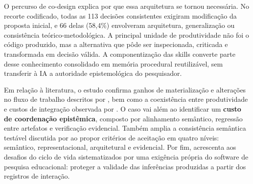\documentclass[preprint,12pt,authoryear]{elsarticle}
\begin{document}
O percurso de co-design explica por que essa arquitetura se tornou necessária. No recorte codificado, todas as 113 decisões consistentes exigiram modificação da proposta inicial, e 66 delas (58,4\%) envolveram arquitetura, generalização ou consistência teórico-metodológica. A principal unidade de produtividade não foi o código produzido, mas a alternativa que pôde ser inspecionada, criticada e transformada em decisão válida. A componentização das skills converte parte desse conhecimento consolidado em memória procedural reutilizável, sem transferir à IA a autoridade epistemológica do pesquisador.

Em relação à literatura, o estudo confirma ganhos de materialização e alterações no fluxo de trabalho descritos por \citet{ulfsnes2024transforming}, bem como a coexistência entre produtividade e custos de integração observada por \citet{song2024impact}. O caso vai além ao identificar um \textbf{custo de coordenação epistêmica}, composto por alinhamento semântico, regressão entre artefatos e verificação evidencial. Também amplia a consistência semântica testável discutida por \citet{zhang2024agilegen} ao propor critérios de aceitação em quatro níveis: semântico, representacional, arquitetural e evidencial. Por fim, acrescenta aos desafios do ciclo de vida sistematizados por \citet{gao2024challenges} uma exigência própria do software de pesquisa educacional: proteger a validade das inferências produzidas a partir dos registros de interação.
\end{document}
